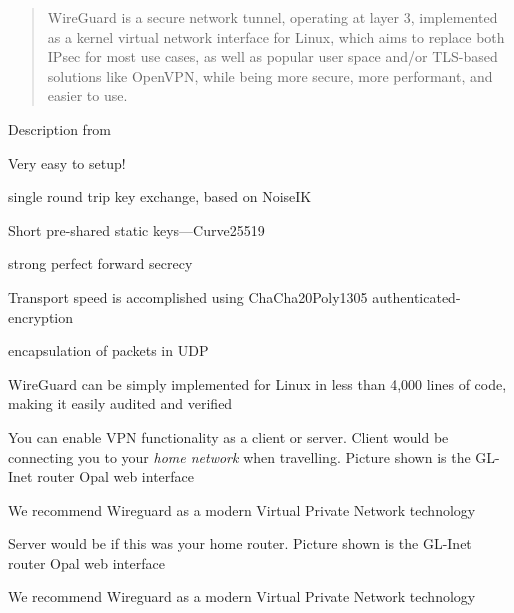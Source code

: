 \documentclass[Screen16to9,17pt]{foils}
\begin{document}

\begin{quote}\small
WireGuard is a secure network tunnel, operating at layer 3, implemented as a kernel virtual network interface for Linux, which aims to replace both IPsec for most use cases, as well as popular user space and/or TLS-based solutions like OpenVPN, while being more secure, more performant, and easier to use.
\end{quote}

Description from 

\begin{list2}
\item Very easy to setup!
\item single round trip key exchange, based on NoiseIK
\item Short pre-shared static keys—Curve25519
\item strong perfect forward secrecy
\item Transport
speed is accomplished using ChaCha20Poly1305 authenticated-encryption
\item encapsulation of packets in UDP
\item WireGuard can be
simply implemented for Linux in less than 4,000 lines of code, making it easily audited and verified
\end{list2}





You can enable VPN functionality as a client or server. Client would be connecting you to your \emph{home network} when travelling. Picture shown is the GL-Inet router Opal web interface

We recommend Wireguard as a modern Virtual Private Network technology



Server would be if this was your home router.  Picture shown is the GL-Inet router Opal web interface

We recommend Wireguard as a modern Virtual Private Network technology



\end{document}
